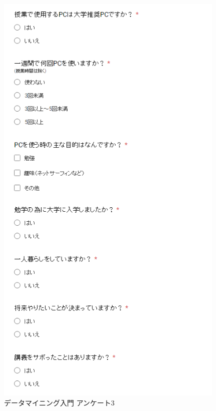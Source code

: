 \begin{figure}[p]
\centering
\includegraphics[width=11cm]{forms3.PNG}
\caption{データマイニング入門 アンケート3}\label{サンプル図}
\end{figure}

